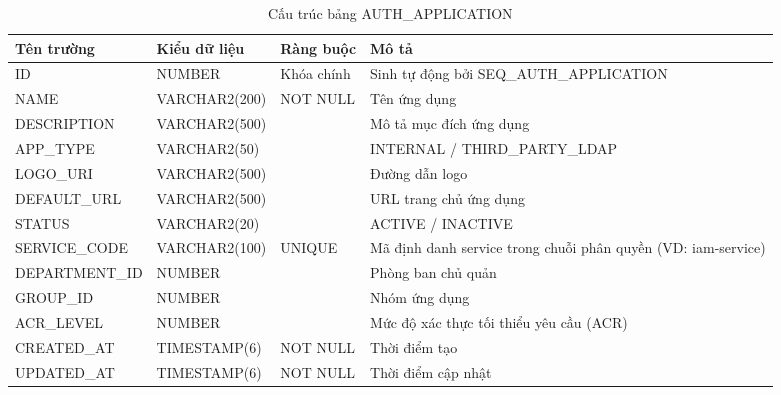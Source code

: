 \documentclass[../DoAn.tex]{subfiles}
\begin{document}
\begin{table}[H]
\centering
\caption{Cấu trúc bảng AUTH\_APPLICATION}
\label{tab:auth-application}
\footnotesize
\begin{tabular}{|p{3.0cm}|p{2.3cm}|p{2.7cm}|p{4.5cm}|}
\hline
\textbf{Tên trường} & \textbf{Kiểu dữ liệu} & \textbf{Ràng buộc} & \textbf{Mô tả} \\ \hline
ID & NUMBER & Khóa chính & Sinh tự động bởi SEQ\_AUTH\_APPLICATION \\ \hline
NAME & VARCHAR2(200) & NOT NULL & Tên ứng dụng \\ \hline
DESCRIPTION & VARCHAR2(500) & & Mô tả mục đích ứng dụng \\ \hline
APP\_TYPE & VARCHAR2(50) & & INTERNAL / THIRD\_PARTY\_LDAP \\ \hline
LOGO\_URI & VARCHAR2(500) & & Đường dẫn logo \\ \hline
DEFAULT\_URL & VARCHAR2(500) & & URL trang chủ ứng dụng \\ \hline
STATUS & VARCHAR2(20) & & ACTIVE / INACTIVE \\ \hline
SERVICE\_CODE & VARCHAR2(100) & UNIQUE & Mã định danh service trong chuỗi phân quyền (VD: iam-service) \\ \hline
DEPARTMENT\_ID & NUMBER & & Phòng ban chủ quản \\ \hline
GROUP\_ID & NUMBER & & Nhóm ứng dụng \\ \hline
ACR\_LEVEL & NUMBER & & Mức độ xác thực tối thiểu yêu cầu (ACR) \\ \hline
CREATED\_AT & TIMESTAMP(6) & NOT NULL & Thời điểm tạo \\ \hline
UPDATED\_AT & TIMESTAMP(6) & NOT NULL & Thời điểm cập nhật \\ \hline
\end{tabular}
\end{table}
\end{document}
